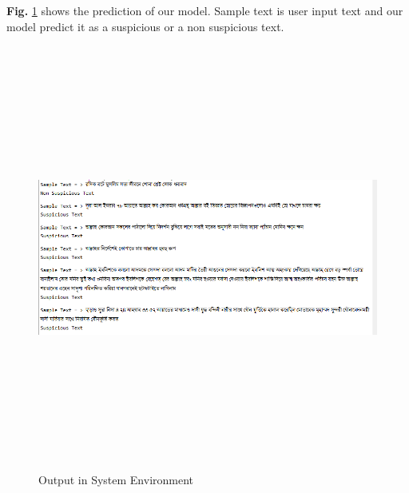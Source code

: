 \par\noindent
\textbf{Fig.} \ref{fig:out} shows the prediction of our model. Sample text is user input text and our model predict it as a suspicious or a non suspicious text.
\par
\vspace{1cm}
\begin{figure}[h!]
    \centering
    \includegraphics[width=15cm, height=14cm]{Figures/output.PNG}
    \caption{Output in System Environment}
    \label{fig:out}
\end{figure}